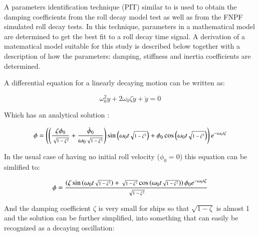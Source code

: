     A parameters identification technique (PIT) similar to
\cite{7505983/EXYJELCU} is used to obtain the damping coefficients from
the roll decay model test as well as from the FNPF simulated roll decay
tests. In this technique, parameters in a mathematical model are
determined to get the best fit to a roll decay time signal. A derivation
of a matematical model suitable for this study is described below
together with a description of how the parameters: damping, stiffness
and inertia coefficients are determined.

A differential equation for a linearly decaying motion can be written
as:
 
            

    \begin{equation}
\omega_{0}^{2} y + 2 \omega_{0} \zeta \dot{y} + \ddot{y} = 0
\label{eq:equation}
\end{equation}

    

    Which has an analytical solution \cite{undefined}:
 
    \begin{equation}
 \scriptsize
\phi = \left(\left(\frac{\zeta \phi_{0}}{\sqrt{1 - \zeta^{2}}} + \frac{\dot{\phi}_{0}}{\omega_{0} \sqrt{1 - \zeta^{2}}}\right) \operatorname{sin}\left(\omega_{0} t \sqrt{1 - \zeta^{2}}\right) + \phi_{0} \operatorname{cos}\left(\omega_{0} t \sqrt{1 - \zeta^{2}}\right)\right) e^{- \omega_{0} t \zeta}
\label{eq:equation}
\end{equation}

    

    In the usual case of having no initial roll velocity (\(\phi_0=0\)) this
equation can be simlified to:
 
            
   
\begin{equation}
\scriptsize
\phi = \frac{\left(\zeta \operatorname{sin}\left(\omega_{0} t \sqrt{1 - \zeta^{2}}\right) + \sqrt{1 - \zeta^{2}} \operatorname{cos}\left(\omega_{0} t \sqrt{1 - \zeta^{2}}\right)\right) \phi_{0} e^{- \omega_{0} t \zeta}}{\sqrt{1 - \zeta^{2}}}
\label{eq:equation}
\end{equation}

    

    And the damping coefficient \(\zeta\) is very small for ships so that
\(\sqrt{1-\zeta}\) is almost 1 and the solution can be further
simplified, into something that can easily be recognized as a decaying
oscillation:
 
            
    
